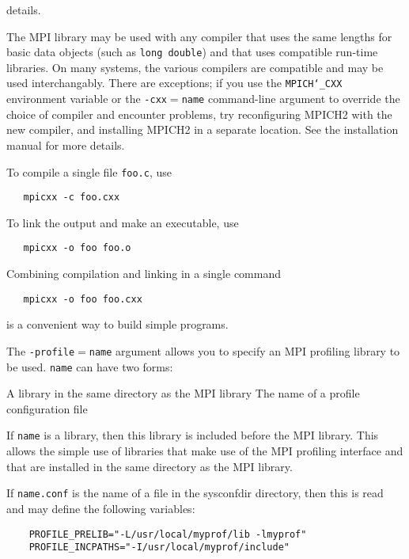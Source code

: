 details.
\par
{}
The MPI library may be used with any compiler that uses the same
lengths for basic data objects (such as {\tt long double}) and that
uses compatible run-time libraries.  On many systems, the various
compilers are compatible and may be used interchangably.  There are
exceptions; if you use the {\tt MPICH{\tt \char`\_}CXX} environment variable or the
{\tt -cxx$=$name} command-line argument to override the choice of compiler
and encounter problems, try reconfiguring MPICH2 with the new compiler,
and installing MPICH2 in a separate location.  See the installation manual
for more details.
\par
{}
To compile a single file {\tt foo.c}, use
\begin{verbatim}
   mpicxx -c foo.cxx
\end{verbatim}

\par
To link the output and make an executable, use
\begin{verbatim}
   mpicxx -o foo foo.o
\end{verbatim}

Combining compilation and linking in a single command
\begin{verbatim}
   mpicxx -o foo foo.cxx
\end{verbatim}

is a convenient way to build simple programs.
\par
{}
The {\tt -profile$=$name} argument allows you to specify an MPI profiling
library to be used.  {\tt name} can have two forms:
\par
\nextline
A library in the same directory as the MPI library
\nextline
The name of a profile configuration file
\nextline
\par
If {\tt name} is a library, then this library is included before the MPI
library.  This allows the simple use of libraries that make use of the
MPI profiling interface and that are installed in the same directory as
the MPI library.
\par
If {\tt name.conf} is the name of a file in the sysconfdir directory, then this
is read and may define the following variables:
\par
\begin{verbatim}
    PROFILE_PRELIB="-L/usr/local/myprof/lib -lmyprof"
    PROFILE_INCPATHS="-I/usr/local/myprof/include"
\end{verbatim}

